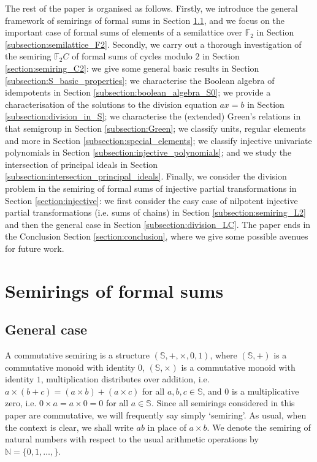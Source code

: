 \documentclass[a4paper, 11pt]{article}
\theoremstyle{plain}
\theoremstyle{definition}
\newcommand{\N} {\mathbb{N}}
\newcommand{\F} {\mathbb{F}}
\begin{document}
The rest of the paper is organised as follows. Firstly, we introduce the general framework of semirings of formal sums in Section \ref{subsection:semirings_general}, and we focus on the important case of formal sums of elements of a semilattice over $\F_2$ in Section \ref{subsection:semilattice_F2}. Secondly, we carry out a thorough investigation of the semiring $\F_2 C$ of formal sums of cycles modulo $2$ in Section \ref{section:semiring_C2}: we give some general basic results in Section \ref{subsection:S_basic_properties}; we characterise the Boolean algebra of idempotents in Section \ref{subsection:boolean_algebra_S0}; we provide a characterisation of the solutions to the division equation $ax = b$ in Section \ref{subsection:division_in_S}; we characterise the (extended) Green's relations in that semigroup in Section \ref{subsection:Green}; we classify units, regular elements and more in Section \ref{subsection:special_elements}; we classify injective univariate polynomials in Section \ref{subsection:injective_polynomials}; and we study the intersection of principal ideals in Section \ref{subsection:intersection_principal_ideals}. Finally, we consider the division problem in the semiring of formal sums of injective partial transformations in Section \ref{section:injective}: we first consider the easy case of nilpotent injective partial transformations (i.e. sums of chains) in Section \ref{subsection:semiring_L2} and then the general case in Section \ref{subsection:division_LC}. The paper ends in the Conclusion Section \ref{section:conclusion}, where we give some possible avenues for future work.





\section{Semirings of formal sums}
\label{section:semiring_formal_sums}

\subsection{General case} \label{subsection:semirings_general}

A commutative semiring is a structure $(\mathbb{S}, +, \times, 0, 1)$, where $(\mathbb{S}, +)$ is a commutative monoid with identity $0$, $(\mathbb{S}, \times)$ is a commutative monoid with identity $1$, multiplication distributes over addition, i.e. $a \times ( b + c ) = ( a \times b ) + (a \times c )$ for all $a, b, c \in \mathbb{S}$, and $0$ is a multiplicative zero, i.e. $0 \times a = a \times 0 = 0$ for all $a \in \mathbb{S}$. Since all semirings considered in this paper are commutative, we will frequently say simply `semiring'. As usual, when the context is clear, we shall write $ab$ in place of $a \times b$. We denote the semiring of natural numbers with respect to the usual arithmetic operations by $\N = \{0, 1, \dots, \}$.
\end{document}
